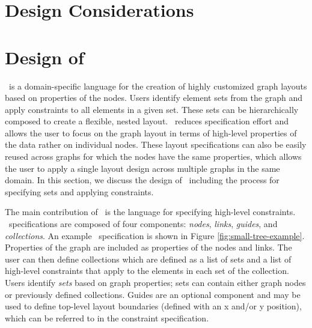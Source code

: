 \section{Design Considerations}


\section{Design of \projectname}
\projectname\ is a domain-specific language for the creation of highly customized graph layouts based on properties of the nodes. Users identify element sets from the graph and apply constraints to all elements in a given set. These sets can be hierarchically composed to create a flexible, nested layout. \projectname\ reduces specification effort and allows the user to focus on the graph layout in terms of high-level properties of the data rather on individual nodes. These layout specifications can also be easily reused across graphs for which the nodes have the same properties, which allows the user to apply a single layout design across multiple graphs in the same domain. In this section, we discuss the design of \projectname\ including the process for specifying sets and applying constraints.

\smallTreeExample

The main contribution of \projectname\ is the language for specifying high-level constraints. \projectname\ specifications are composed of four components: \emph{nodes}, \emph{links}, \emph{guides}, and \emph{collections}. An example \projectname\ specification is shown in Figure \ref{fig:small-tree-example}. Properties of the graph are included as properties of the nodes and links. The user can then define collections which are defined as a list of sets and a list of high-level constraints that apply to the elements in each set of the collection. Users identify \emph{sets} based on graph properties; sets can contain either graph nodes or previously defined collections. Guides are an optional component and may be used to define top-level layout boundaries (defined with an x and/or y position), which can be referred to in the constraint specification.

